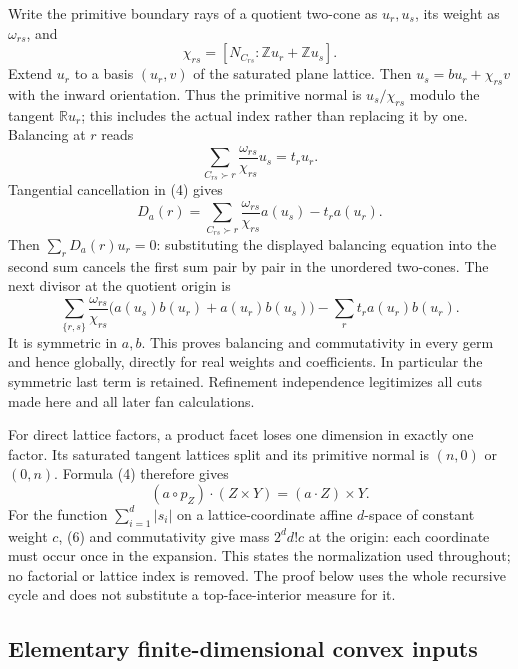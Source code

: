 \documentclass[
  11pt,
]{article}
\begin{document}
Write the primitive boundary rays of a quotient two-cone as \(u_r,u_s\),
its weight as \(\omega_{rs}\), and
\[\chi_{rs}=[N_{C_{rs}}:\mathbb Zu_r+\mathbb Zu_s].\] Extend \(u_r\) to
a basis \((u_r,v)\) of the saturated plane lattice. Then
\(u_s=b u_r+\chi_{rs}v\) with the inward orientation. Thus the primitive
normal is \(u_s/\chi_{rs}\) modulo the tangent \(\mathbb Ru_r\); this
includes the actual index rather than replacing it by one. Balancing at
\(r\) reads
\[\sum_{C_{rs}\succ r}\frac{\omega_{rs}}{\chi_{rs}}u_s=t_ru_r.\]
Tangential cancellation in (4) gives
\[D_a(r)=\sum_{C_{rs}\succ r}\frac{\omega_{rs}}{\chi_{rs}}a(u_s)-t_ra(u_r).\]
Then \(\sum_rD_a(r)u_r=0\): substituting the displayed balancing
equation into the second sum cancels the first sum pair by pair in the
unordered two-cones. The next divisor at the quotient origin is \[
\sum_{\{r,s\}}\frac{\omega_{rs}}{\chi_{rs}}
\bigl(a(u_s)b(u_r)+a(u_r)b(u_s)\bigr)
-\sum_rt_ra(u_r)b(u_r). \tag{5}
\] It is symmetric in \(a,b\). This proves balancing and commutativity
in every germ and hence globally, directly for real weights and
coefficients. In particular the symmetric last term is retained.
Refinement independence legitimizes all cuts made here and all later fan
calculations.

For direct lattice factors, a product facet loses one dimension in
exactly one factor. Its saturated tangent lattices split and its
primitive normal is \((n,0)\) or \((0,n)\). Formula (4) therefore gives
\[ (a\circ p_Z)\cdot(Z\times Y)=(a\cdot Z)\times Y. \tag{6} \] For the
function \(\sum_{i=1}^d|s_i|\) on a lattice-coordinate affine
\(d\)-space of constant weight \(c\), (6) and commutativity give mass
\(2^d d!c\) at the origin: each coordinate must occur once in the
expansion. This states the normalization used throughout; no factorial
or lattice index is removed. The proof below uses the whole recursive
cycle and does not substitute a top-face-interior measure for it.

\subsection{Elementary finite-dimensional convex
inputs}\label{elementary-finite-dimensional-convex-inputs}
\end{document}
